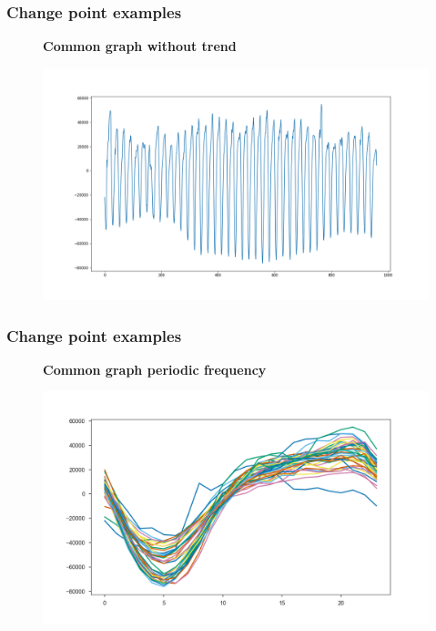 \documentclass[intlimits, 9pt, unicode]{beamer}
\begin{document}
\begin{frame}
\frametitle{Change point examples}
\begin{figure}
\textbf{Common graph without trend}\par\medskip
\includegraphics[scale=0.30]{images/001_normal_3}
\end{figure}
\end{frame}

\begin{frame}
\frametitle{Change point examples}
\begin{figure}
\textbf{Common graph periodic frequency}\par\medskip
\includegraphics[scale=0.30]{images/001_normal_4}
\end{figure}
\end{frame}
\end{document}
